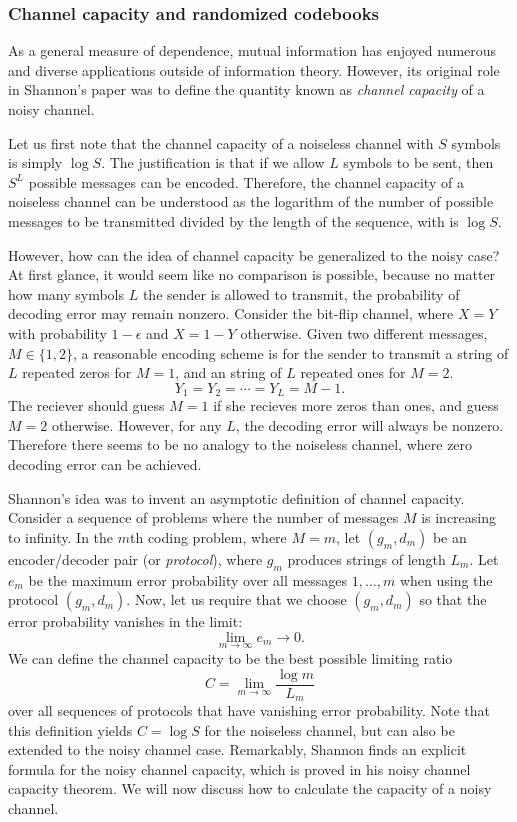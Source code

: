 \subsubsection{Channel capacity and randomized codebooks}

As a general measure of dependence, mutual information has enjoyed
numerous and diverse applications outside of information theory.
However, its original role in Shannon's paper was to define the
quantity known as \emph{channel capacity} of a noisy channel.

Let us first note that the channel capacity of a noiseless channel
with $S$ symbols is simply $\log S$.  The justification is that if we
allow $L$ symbols to be sent, then $S^L$ possible messages can be
encoded.  Therefore, the channel capacity of a noiseless channel can
be understood as the logarithm of the number of possible messages to
be transmitted divided by the length of the sequence, with is $\log
S$.

However, how can the idea of channel capacity be generalized to the
noisy case?  At first glance, it would seem like no comparison is
possible, because no matter how many symbols $L$ the sender is allowed
to transmit, the probability of decoding error may remain nonzero.
Consider the bit-flip channel, where $X = Y$ with probability
$1-\epsilon$ and $X = 1-Y$ otherwise.  Given two different messages,
$M \in \{1,2\}$, a reasonable encoding scheme is for the sender to
transmit a string of $L$ repeated zeros for $M = 1$, and an string of
$L$ repeated ones for $M = 2$.
\[
Y_1 = Y_2 = \cdots = Y_L = M-1.
\]
The reciever should guess $M = 1$ if she recieves more zeros than
ones, and guess $M = 2$ otherwise.  However, for any $L$, the decoding
error will always be nonzero.  Therefore there seems to be no analogy
to the noiseless channel, where zero decoding error can be achieved.

Shannon's idea was to invent an asymptotic definition of channel
capacity.  Consider a sequence of problems where the number of
messages $M$ is increasing to infinity.  In the $m$th coding problem,
where $M = m$, let $(g_m, d_m)$ be an encoder/decoder pair (or \emph{protocol}), where
$g_m$ produces strings of length $L_m$.  Let $e_m$ be the maximum
error probability over all messages $1,\hdots, m$ when using the
protocol $(g_m, d_m)$.  Now, let us require that we choose $(g_m,
d_m)$ so that the error probability vanishes in the limit:
\[
\lim_{m \to \infty} e_m \to 0.
\]
We can define the channel capacity to be the best possible limiting ratio
\[
C = \lim_{m \to \infty} \frac{\log m}{L_m}
\]
over all sequences of protocols that have vanishing error probability.
Note that this definition yields $C = \log S$ for the noiseless
channel, but can also be extended to the noisy channel case.
Remarkably, Shannon finds an explicit formula for the noisy channel
capacity, which is proved in his noisy channel capacity theorem.  We
will now discuss how to calculate the capacity of a noisy channel.

